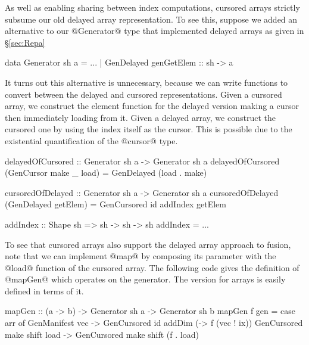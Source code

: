 As well as enabling sharing between index computations, cursored arrays strictly subsume our old delayed array representation. To see this, suppose we added an alternative to our @Generator@ type that implemented delayed arrays as given in \S\ref{sec:Repa}

\begin{small}
\begin{code}
  data Generator sh a
      = ...
      | GenDelayed { genGetElem  :: sh -> a }
\end{code}
\end{small}

It turns out this alternative is unnecessary, because we can write functions to convert between the delayed and cursored representations. Given a cursored array, we construct the element function for the delayed version making a cursor then immediately loading from it. Given a delayed array, we construct the cursored one by using the index itself as the cursor. This is possible due to the existential quantification of the @cursor@ type.

\begin{small}
\begin{code}
 delayedOfCursored :: Generator sh a -> Generator sh a
 delayedOfCursored (GenCursor make _ load)
         = GenDelayed (load . make)
 
 cursoredOfDelayed :: Generator sh a -> Generator sh a
 cursoredOfDelayed (GenDelayed getElem)
         = GenCursored id addIndex getElem

 addIndex :: Shape sh => sh -> sh -> sh
 addIndex = ...
\end{code}
\end{small}

To see that cursored arrays also support the delayed array approach to fusion, note that we can implement @map@ by composing its parameter with the @load@ function of the cursored array. The following code gives the definition of @mapGen@ which operates on the generator. The version for arrays is easily defined in terms of it.

\begin{small}
\begin{code}
 mapGen :: (a -> b) -> Generator sh a -> Generator sh b
 mapGen f gen
  = case arr of
     GenManifest vec  
       -> GenCursored id addDim  (\ix -> f (vec ! ix))
     GenCursored make shift load
       -> GenCursored make shift (f . load)
\end{code}
\end{small}

